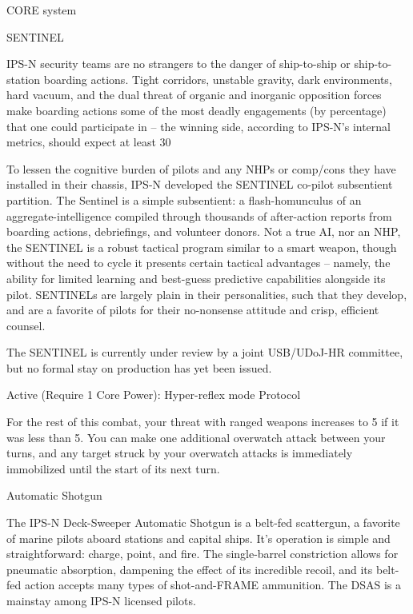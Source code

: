                                                 CORE system




                                                         SENTINEL


  IPS-N security teams are no strangers to the danger of ship-to-ship or ship-to-station boarding actions.
   Tight corridors, unstable gravity, dark environments, hard vacuum, and the dual threat of organic and
  inorganic opposition forces make boarding actions some of the most deadly engagements (by
  percentage) that one could participate in -- the winning side, according to IPS-N’s internal metrics,
  should expect at least 30%

   To lessen the cognitive burden of pilots and any NHPs or comp/cons they have installed in their chassis,
  IPS-N developed the SENTINEL co-pilot subsentient partition. The Sentinel is a simple subsentient: a
  flash-homunculus of an aggregate-intelligence compiled through thousands of after-action reports from
  boarding actions, debriefings, and volunteer donors. Not a true AI, nor an NHP, the SENTINEL is a
  robust tactical program similar to a smart weapon, though without the need to cycle it presents certain
  tactical advantages -- namely, the ability for limited learning and best-guess predictive capabilities
  alongside its pilot. SENTINELs are largely plain in their personalities, such that they develop, and are a
  favorite of pilots for their no-nonsense attitude and crisp, efficient counsel.

   The SENTINEL is currently under review by a joint USB/UDoJ-HR committee, but no formal stay on
  production has yet been issued.

  Active (Require 1 Core Power): Hyper-reflex mode
   Protocol

   For the rest of this combat, your threat with ranged weapons increases to 5 if it was less than 5. You
  can make one additional overwatch attack between your turns, and any target struck by your
  overwatch attacks is immediately immobilized until the start of its next turn.

Automatic Shotgun

The IPS-N Deck-Sweeper Automatic Shotgun is a belt-fed scattergun, a favorite of marine pilots aboard stations and
capital ships. It’s operation is simple and straightforward: charge, point, and fire. The single-barrel constriction allows
for pneumatic absorption, dampening the effect of its incredible recoil, and its belt-fed action accepts many types of
shot-and-FRAME ammunition.
The DSAS is a mainstay among IPS-N licensed pilots.

